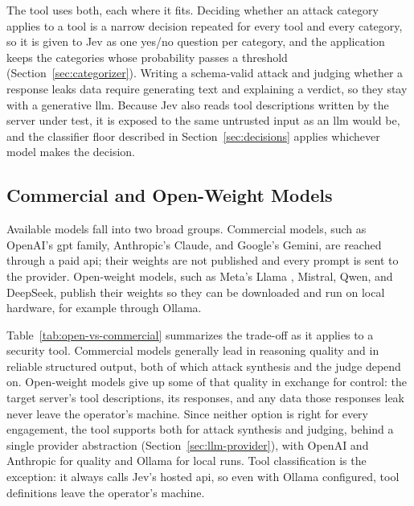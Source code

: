 The tool uses both, each where it fits. Deciding whether an attack category applies to a tool is a narrow decision repeated for every tool and every category, so it is given to Jev as one yes/no question per category, and the application keeps the categories whose probability passes a threshold (Section~\ref{sec:categorizer}). Writing a schema-valid attack and judging whether a response leaks data require generating text and explaining a verdict, so they stay with a generative \gls{llm}. Because Jev also reads tool descriptions written by the server under test, it is exposed to the same untrusted input as an \gls{llm} would be, and the classifier floor described in Section~\ref{sec:decisions} applies whichever model makes the decision.

\subsection{Commercial and Open-Weight Models}
\label{sec:llm-models}

Available models fall into two broad groups. Commercial models, such as OpenAI's \gls{gpt} family, Anthropic's Claude, and Google's Gemini, are reached through a paid \gls{api}; their weights are not published and every prompt is sent to the provider. Open-weight models, such as Meta's Llama \citep{touvron2023llama}, Mistral, Qwen, and DeepSeek, publish their weights so they can be downloaded and run on local hardware, for example through Ollama.

Table~\ref{tab:open-vs-commercial} summarizes the trade-off as it applies to a security tool. Commercial models generally lead in reasoning quality and in reliable structured output, both of which attack synthesis and the judge depend on. Open-weight models give up some of that quality in exchange for control: the target server's tool descriptions, its responses, and any data those responses leak never leave the operator's machine. Since neither option is right for every engagement, the tool supports both for attack synthesis and judging, behind a single provider abstraction (Section~\ref{sec:llm-provider}), with OpenAI and Anthropic for quality and Ollama for local runs. Tool classification is the exception: it always calls Jev's hosted \gls{api}, so even with Ollama configured, tool definitions leave the operator's machine.

